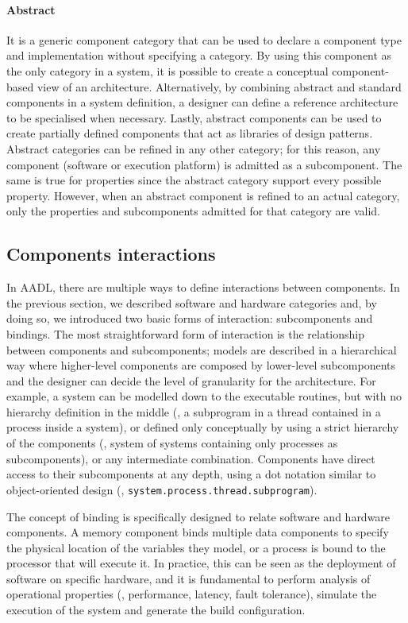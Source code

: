 \paragraph{Abstract} It is a generic component category that can be used to declare a component type and implementation without specifying a category. By using this component as the only category in a system, it is possible to create a conceptual component-based view of an architecture. Alternatively, by combining abstract and standard components in a system definition, a designer can define a reference architecture to be specialised when necessary. Lastly, abstract components can be used to create partially defined components that act as libraries of design patterns. Abstract categories can be refined in any other category; for this reason, any component (software or execution platform) is admitted as a subcomponent. The same is true for properties since the abstract category support every possible property. However, when an abstract component is refined to an actual category, only the properties and subcomponents admitted for that category are valid.

\subsection{Components interactions}
In AADL, there are multiple ways to define interactions between components. In the previous section, we described software and hardware categories and, by doing so, we introduced two basic forms of interaction: subcomponents and bindings. The most straightforward form of interaction is the relationship between components and subcomponents; models are described in a hierarchical way where higher-level components are composed by lower-level subcomponents and the designer can decide the level of granularity for the architecture. For example, a system can be modelled down to the executable routines, but with no hierarchy definition in the middle (\ie, a subprogram in a thread contained in a process inside a system), or defined only conceptually by using a strict hierarchy of the components (\ie, system of systems containing only processes as subcomponents), or any intermediate combination. Components have direct access to their subcomponents at any depth, using a dot notation similar to object-oriented design (\eg, \texttt{system.process.thread.subprogram}).

The concept of binding is specifically designed to relate software and hardware components. A memory component binds multiple data components to specify the physical location of the variables they model, or a process is bound to the processor that will execute it. In practice, this can be seen as the deployment of software on specific hardware, and it is fundamental to perform analysis of operational properties (\eg, performance, latency, fault tolerance), simulate the execution of the system and generate the build configuration.

